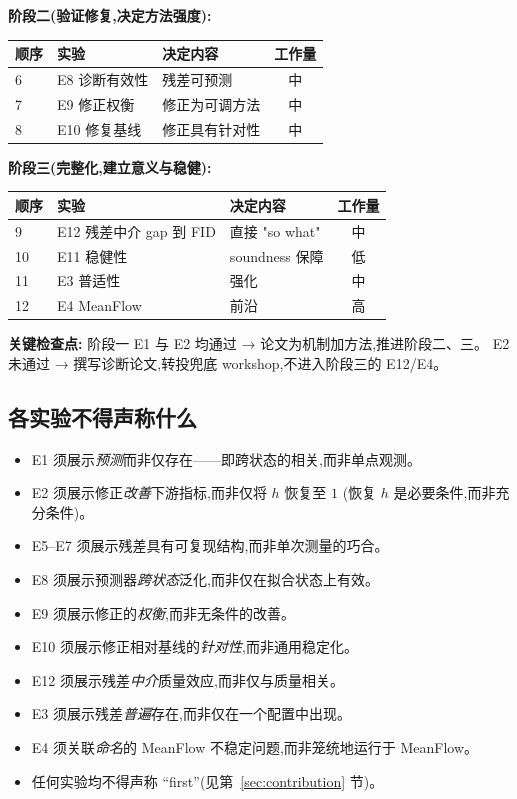\documentclass[UTF8,11pt,a4paper]{ctexart}
\begin{document}
\textbf{阶段二(验证修复,决定方法强度):}
\begin{center}
\begin{tabular}{@{}lllc@{}}
\toprule
顺序 & 实验 & 决定内容 & 工作量 \\
\midrule
6 & E8 诊断有效性 & 残差可预测 & 中 \\
7 & E9 修正权衡 & 修正为可调方法 & 中 \\
8 & E10 修复基线 & 修正具有针对性 & 中 \\
\bottomrule
\end{tabular}
\end{center}

\textbf{阶段三(完整化,建立意义与稳健):}
\begin{center}
\begin{tabular}{@{}lllc@{}}
\toprule
顺序 & 实验 & 决定内容 & 工作量 \\
\midrule
9 & E12 残差中介 gap 到 FID & 直接 "so what" & 中 \\
10 & E11 稳健性 & soundness 保障 & 低 \\
11 & E3 普适性 & 强化 & 中 \\
12 & E4 MeanFlow & 前沿 & 高 \\
\bottomrule
\end{tabular}
\end{center}

\textbf{关键检查点:} 阶段一 E1 与 E2 均通过 → 论文为机制加方法,推进阶段二、三。
E2 未通过 → 撰写诊断论文,转投兜底 workshop,不进入阶段三的 E12/E4。

\subsection{各实验不得声称什么}
\begin{itemize}
  \item E1 须展示\emph{预测}而非仅存在——即跨状态的相关,而非单点观测。
  \item E2 须展示修正\emph{改善}下游指标,而非仅将 $h$ 恢复至 $1$
        (恢复 $h$ 是必要条件,而非充分条件)。
  \item E5--E7 须展示残差具有可复现结构,而非单次测量的巧合。
  \item E8 须展示预测器\emph{跨状态}泛化,而非仅在拟合状态上有效。
  \item E9 须展示修正的\emph{权衡},而非无条件的改善。
  \item E10 须展示修正相对基线的\emph{针对性},而非通用稳定化。
  \item E12 须展示残差\emph{中介}质量效应,而非仅与质量相关。
  \item E3 须展示残差\emph{普遍}存在,而非仅在一个配置中出现。
  \item E4 须关联\emph{命名}的 MeanFlow 不稳定问题,而非笼统地运行于 MeanFlow。
  \item 任何实验均不得声称 ``first''(见第~\ref{sec:contribution} 节)。
\end{itemize}
\end{document}
